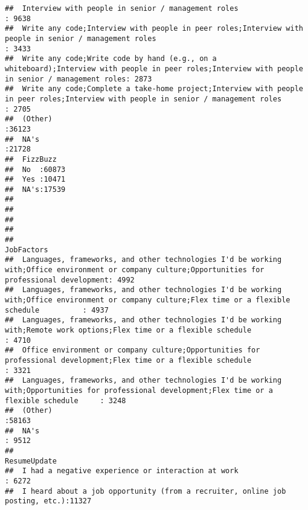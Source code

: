 \documentclass[]{article}
\begin{document}
\begin{verbatim}
##  Interview with people in senior / management roles                                                                                              : 9638  
##  Write any code;Interview with people in peer roles;Interview with people in senior / management roles                                           : 3433  
##  Write any code;Write code by hand (e.g., on a whiteboard);Interview with people in peer roles;Interview with people in senior / management roles: 2873  
##  Write any code;Complete a take-home project;Interview with people in peer roles;Interview with people in senior / management roles              : 2705  
##  (Other)                                                                                                                                         :36123  
##  NA's                                                                                                                                            :21728  
##  FizzBuzz    
##  No  :60873  
##  Yes :10471  
##  NA's:17539  
##              
##              
##              
##              
##                                                                                                                                               JobFactors   
##  Languages, frameworks, and other technologies I'd be working with;Office environment or company culture;Opportunities for professional development: 4992  
##  Languages, frameworks, and other technologies I'd be working with;Office environment or company culture;Flex time or a flexible schedule          : 4937  
##  Languages, frameworks, and other technologies I'd be working with;Remote work options;Flex time or a flexible schedule                            : 4710  
##  Office environment or company culture;Opportunities for professional development;Flex time or a flexible schedule                                 : 3321  
##  Languages, frameworks, and other technologies I'd be working with;Opportunities for professional development;Flex time or a flexible schedule     : 3248  
##  (Other)                                                                                                                                           :58163  
##  NA's                                                                                                                                              : 9512  
##                                                                        ResumeUpdate  
##  I had a negative experience or interaction at work                          : 6272  
##  I heard about a job opportunity (from a recruiter, online job posting, etc.):11327  

\end{verbatim}
\end{document}

